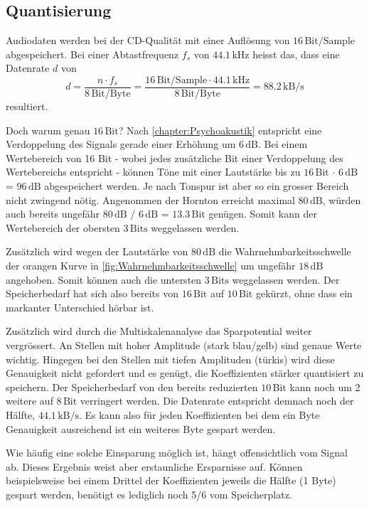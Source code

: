\begin{refsection}
\subsection{Quantisierung}
\label{chapter=quantisierung}
Audiodaten werden bei der CD-Qualität mit einer Auflösung von $16\,\text{Bit/Sample}$ abgespeichert. 
Bei einer Abtastfrequenz $f_s$ von $44.1\,\text{kHz}$ heisst das, dass eine Datenrate $d$ von 
\begin{equation}
d = \frac{n \cdot f_s}{8\,\text{Bit/Byte}} = \frac{16\,\text{Bit/Sample} \cdot 44.1\,\text{kHz}}{8\,\text{Bit/Byte}} = 88.2\,\text{kB/s}
\end{equation}
resultiert.

Doch warum genau $16\,\text{Bit}$?
Nach \autoref{chapter:Psychoakustik} entspricht eine Verdoppelung des Signals gerade einer Erhöhung um $6\,\text{dB}$.
Bei einem Wertebereich von 16 Bit - wobei jedes zusätzliche Bit einer Verdoppelung des Wertebereichs entspricht - können Töne mit einer Lautstärke bis zu
$16\,\text{Bit}$ $\cdot$ $6\,\text{dB}$ = $96\,\text{dB}$
abgespeichert werden.
Je nach Tonspur ist aber so ein grosser Bereich nicht zwingend nötig.
Angenommen der Hornton erreicht maximal $80\,\text{dB}$, würden auch bereits ungefähr
$80\,\text{dB}$ / $6\,\text{dB}$ =  $13.3\,\text{Bit}$
genügen. 
Somit kann der Wertebereich der obersten $3\,\text{Bits}$ weggelassen werden.

Zusätzlich wird wegen der Lautstärke von $80\,\text{dB}$ die Wahrnehmbarkeitsschwelle der orangen Kurve in \autoref{fig:Wahrnehmbarkeitsschwelle} um ungefähr $18\,\text{dB}$ angehoben.
Somit können auch die untersten $3\,\text{Bits}$ weggelassen werden.
Der Speicherbedarf hat sich also bereits von $16\,\text{Bit}$ auf $10\,\text{Bit}$ gekürzt, ohne dass ein markanter Unterschied hörbar ist.


Zusätzlich wird durch die Multiskalenanalyse das Sparpotential weiter vergrössert.
An Stellen mit hoher Amplitude (stark blau/gelb) sind genaue Werte wichtig.
Hingegen bei den Stellen mit tiefen Amplituden (türkis) wird diese Genauigkeit nicht gefordert und es genügt, die Koeffizienten stärker quantisiert zu speichern.
Der Speicherbedarf von den bereits reduzierten $10\,\text{Bit}$ kann noch um 2 weitere auf $8\,\text{Bit}$ verringert werden.
Die Datenrate entspricht demnach noch der Hälfte, $44.1\,\text{kB/s}$.
Es kann also für jeden Koeffizienten bei dem ein Byte Genauigkeit ausreichend ist ein weiteres Byte gespart werden.

Wie häufig eine solche Einsparung möglich ist, hängt offensichtlich vom Signal ab.
Dieses Ergebnis weist aber erstaunliche Ersparnisse auf.
Können beispielsweise bei einem Drittel der Koeffizienten jeweils die Hälfte (1 Byte) gespart werden, benötigt es lediglich noch 5/6 vom Speicherplatz.


\end{refsection}
